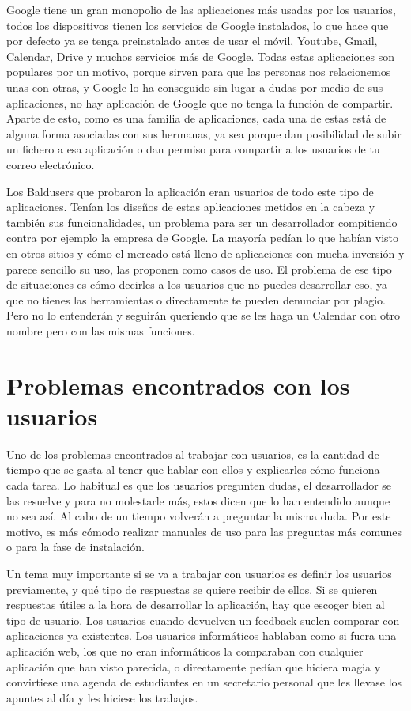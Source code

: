 Google tiene un gran monopolio de las aplicaciones más usadas por los usuarios, todos los dispositivos tienen los servicios de Google instalados, lo que hace que por defecto ya se tenga preinstalado antes de usar el móvil, Youtube, Gmail, Calendar, Drive y muchos servicios más de Google.
Todas estas aplicaciones son populares por un motivo, porque sirven para que las personas nos relacionemos unas con otras, y Google lo ha conseguido sin lugar a dudas por medio de sus aplicaciones, no hay aplicación de Google que no tenga la función de compartir.
Aparte de esto, como es una familia de aplicaciones, cada una de estas está de alguna forma asociadas con sus hermanas, ya sea porque dan posibilidad de subir un fichero a esa aplicación o dan permiso para compartir a los usuarios de tu correo electrónico.

Los Baldusers que probaron la aplicación eran usuarios de todo este tipo de aplicaciones. Tenían los diseños de estas aplicaciones metidos en la cabeza y también sus funcionalidades, un problema para ser un desarrollador compitiendo contra por ejemplo la empresa de Google.
La mayoría pedían lo que habían visto en otros sitios y cómo el mercado está lleno de aplicaciones con mucha inversión y parece sencillo su uso, las proponen como casos de uso. 
El problema de ese tipo de situaciones es cómo decirles a los usuarios que no puedes desarrollar eso, ya que no tienes las herramientas o directamente te pueden denunciar por plagio.
Pero no lo entenderán y seguirán queriendo que se les haga un Calendar con otro nombre pero con las mismas funciones.


\section{Problemas encontrados con los usuarios}
\label{secc:problemas encontrados con los usuarios}

Uno de los problemas encontrados al trabajar con usuarios, es la cantidad de tiempo que se gasta al tener que hablar con ellos y explicarles cómo funciona cada tarea.
Lo habitual es que los usuarios pregunten dudas, el desarrollador se las resuelve y para no molestarle más, estos dicen que lo han entendido aunque no sea así. Al cabo de un tiempo volverán a preguntar la misma duda. Por este motivo, es más cómodo  realizar manuales de uso para las preguntas más comunes o para la fase de instalación.

Un tema muy importante si se va a trabajar con usuarios es definir los usuarios previamente, y qué tipo de respuestas se quiere recibir de ellos. Si se quieren respuestas útiles a la hora de desarrollar la aplicación, hay que escoger bien al tipo de usuario.
Los usuarios cuando devuelven un feedback suelen comparar con aplicaciones ya existentes.
Los usuarios informáticos hablaban como si fuera una aplicación web, los que no eran informáticos la comparaban con cualquier aplicación que han visto parecida, o directamente pedían que hiciera magia y convirtiese  una agenda de estudiantes en un secretario personal que les llevase los apuntes al día y les hiciese los trabajos.

